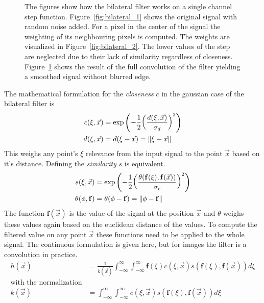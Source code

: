 \begin{figure}[H]
\begin{subfigure}[b]{0.3\linewidth}
        \caption{}\label{fig:bilateral_3}
    \end{subfigure}
    \caption{The figures show how the bilateral filter works on a single channel step function. Figure~\ref{fig:bilateral_1} shows the original signal with random noise added. For a pixel in the center of the signal the weighting of its neighbouring pixels is computed. The weights are visualized in Figure~\ref{fig:bilateral_2}. The lower values of the step are neglected due to their lack of similarity regardless of closeness. Figure~\ref{fig:bilateral_3} shows the result of the full convolution of the filter yielding a smoothed signal without blurred edge.}\label{fig:bilateral_filter}
\end{figure}
The mathematical formulation for the \emph{closeness} $c$ in the gaussian case of the bilateral filter is
\begin{equation}
\begin{aligned}
    c(\xi, \vec{x})&= \exp\left(-\frac{1}{2}{\left(\frac{d(\xi, \vec{x})}{\sigma_d} \right)}^2 \right) \\
    d(\xi, \vec{x})&= d(\xi - \vec{x}) = \lVert\xi - \vec{x}\rVert
\end{aligned}
\end{equation}
This weighs any point's $\xi$ relevance from the input signal to the point $\vec{x}$ based on it's distance.
Defining the \emph{similarity} $s$ is equivalent.
\begin{equation}
\begin{aligned}
    s(\xi, \vec{x})&= \exp\left(-\frac{1}{2}{\left(\frac{\theta(\mathbf{f}(\xi), \mathbf{f}(\vec{x}))}{\sigma_r}\right)}^2\right) \\
    \theta(\phi, \mathbf{f})&= \theta(\phi - \mathbf{f}) = \lVert\phi - \mathbf{f}\rVert
\end{aligned}
\end{equation}
The function $\mathbf{f}(\vec{x})$ is the value of the signal at the position $\vec{x}$ and $\theta$ weighs these values again based on the euclidean distance of the values.
To compute the filtered value on any point $\vec{x}$ these functions need to be applied to the whole signal.
The continuous formulation is given here, but for images the filter is a convolution in practice.
\begin{equation}
\begin{aligned}
    h(\vec{x}) &= \frac{1}{k(\vec{x})} \int_{-\infty}^{\infty} \int_{-\infty}^{\infty} \mathbf{f}(\xi) c(\xi, \vec{x}) s(\mathbf{f}(\xi), \mathbf{f}(\vec{x})) d\xi \\
    \text{with the normalization} \\
    k(\vec{x}) &= \int_{-\infty}^{\infty} \int_{-\infty}^{\infty} c(\xi, \vec{x}) s(\mathbf{f}(\xi), \mathbf{f}(\vec{x})) d\xi
\end{aligned}
\end{equation}
